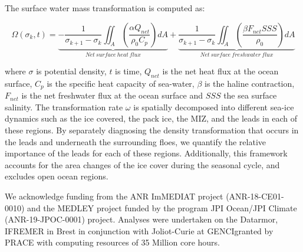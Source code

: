 \documentclass[lineno,sn-basic]{sn-jnl}%
\begin{document}
The surface water mass transformation is computed as:

\begin{equation}
    \Omega(\sigma_k,t) = \underbrace{- \frac{1}{\sigma_{k+1}-\sigma_k}\iint_A\left(\frac{\alpha Q_{net}}{\rho_0 C_p}\right)dA}_{Net\ surface\ heat\ flux} + \underbrace{\frac{1}{\sigma_{k+1}-\sigma_k}\iint_A\left(\frac{\beta F_{net} SSS }{\rho_0}\right)dA}_{Net\ surface\ freshwater\ flux}
\end{equation}

where $\sigma$ is potential density, $t$ is time, $Q_{net}$ is the net heat flux at the ocean surface, $C_p$ is the specific heat capacity of sea-water, $\beta$ is the haline contraction, $F_{net}$ is the net freshwater flux at the ocean surface and $SSS$ the sea surface salinity. The transformation rate $\omega$ is spatially decomposed into different sea-ice dynamics such as the ice covered, the pack ice, the MIZ, and the leads in each of these regions. 
By separately diagnosing the density transformation that occurs in the leads and underneath the surrounding floes, we quantify the relative importance of the leads for each of these regions. Additionally, this framework accounts for the area changes of the ice cover during the seasonal cycle, and excludes open ocean regions.

\backmatter



We acknowledge funding from the ANR ImMEDIAT project (ANR-18-CE01-0010) and the MEDLEY project funded by the program JPI Ocean/JPI Climate (ANR-19-JPOC-0001) project. Analyses were undertaken on the Datarmor, IFREMER in Brest in conjunction with Joliot-Curie at GENCI\makeatletter@CEA granted by PRACE with computing resources of 35 Million core hours.



\end{document}
